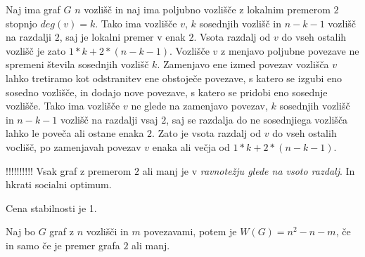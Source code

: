 \documentclass[fin1, tisk]{fmfdelo}
\begin{document}
\begin{dokaz}
Naj ima graf $G$ $n$ vozlišč in naj ima poljubno vozlišče z lokalnim premerom $2$
stopnjo $deg(v) = k$. Tako ima vozlišče $v$, $k$ sosednjih vozlišč in $n - k - 1$
vozlišč na razdalji $2$, saj je lokalni premer v enak $2$. Vsota razdalj od $v$
do vseh ostalih vozlišč je zato $1*k + 2*(n - k - 1)$.
Vozlišče $v$ z menjavo poljubne povezave ne spremeni števila sosednjih vozlišč $k$.
Zamenjavo ene izmed povezav vozlišča $v$ lahko tretiramo kot odstranitev ene
obstoječe povezave, s katero se izgubi eno sosedno vozlišče, in dodajo nove povezave,
s katero se pridobi eno sosednje vozlišče. Tako ima vozlišče $v$ ne glede na
zamenjavo povezav, $k$ sosednjih vozlišč in $n - k - 1$ vozlišč na razdalji vsaj $2$,
saj se razdalja do ne sosednjiega vozlišča lahko le poveča ali ostane enaka $2$.
Zato je vsota razdalj od $v$ do vseh ostalih voclišč, po zamenjavah povezav $v$
enaka ali večja od $1*k + 2*(n - k - 1)$.
\end{dokaz}





\begin{posledica}
!!!!!!!!!! Vsak graf z premerom $2$ ali manj je v \textit{ravnotežju glede na vsoto razdalj}.
In hkrati socialni optimum.
\end{posledica}

\begin{posledica}
Cena stabilnosti je 1.
\end{posledica}


\begin{izrek}
Naj bo $G$ graf z $n$ vozlišči in $m$ povezavami, potem je $W(G) = n^2 - n - m$, če in samo če je premer grafa $2$ ali manj.
\end{izrek}
\end{document}
